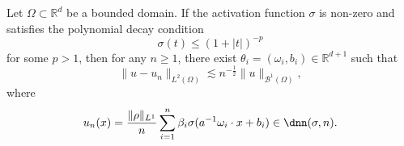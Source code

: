 



 
\iffalse
Then we propose the next assumption on $\sigma$
\begin{assumption}\label{assump:sigma}[Siegle \& Xu 2020]
	Let $\sigma \in L^{\infty}(\Omega)$ and there exists $p> 1$  such that
	\begin{equation}\label{key}
	|\sigma(t)| \le (1+|t|)^{-p}.
	\end{equation}
\end{assumption}


Then we have the next important lemma about the estimate of $\rho(\theta)$.
\fi

\begin{theorem}\label{approximation_rate_theoreml2}
 Let $\Omega\subset \mathbb{R}^d$ be a bounded domain. If the activation function $\sigma $ is non-zero and satisfies the polynomial decay condition 
$$
\sigma(t) \le (1+|t|)^{-p}
$$
for some $p>1$, then for any $n \ge 1$, there exist 
	$\theta_i = (\omega_i, b_i) \in \mathbb{R}^{d+1}$ such that
	\begin{equation}\label{key}
	\|u-u_n\|_{L^{2}(\Omega)} \lesssim n^{-\frac{1}{2}}\|u\|_{\mathcal B^1(\Omega)},
	\end{equation}
	where
	\begin{equation}\label{key}
	u_n(x) = \frac{\|\rho\|_{L^1}}{n} \sum_{i=1}^n \beta_i {\sigma}(a^{-1}\omega_i\cdot x + b_i) %
	\in \dnn(\sigma, n).
	\end{equation}
\end{theorem}

